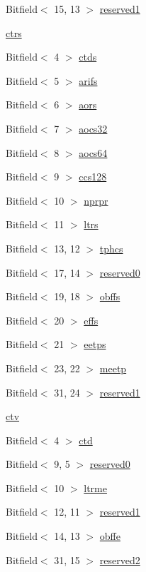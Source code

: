 \begin{DoxyCompactItemize}
Bitfield$<$ 15, 13 $>$ \hyperlink{structPXCAP_a94824b72d359a5c88960a7f3d41aae2f}{reserved1}
\item 
\hyperlink{structPXCAP_a646bd67675016bd2e5348dc4737f403c}{ctrs}
\item 
Bitfield$<$ 4 $>$ \hyperlink{structPXCAP_afbcc12ce276af1d2d296fb390021f960}{ctds}
\item 
Bitfield$<$ 5 $>$ \hyperlink{structPXCAP_a39a121912175377c1eac9c432103e14f}{arifs}
\item 
Bitfield$<$ 6 $>$ \hyperlink{structPXCAP_a98115afc2014b88488a076c132269457}{aors}
\item 
Bitfield$<$ 7 $>$ \hyperlink{structPXCAP_aaf5eba11f85bdbb91991eabb578184ae}{aocs32}
\item 
Bitfield$<$ 8 $>$ \hyperlink{structPXCAP_a25e7f60f617419ee6fcdd90a4add3434}{aocs64}
\item 
Bitfield$<$ 9 $>$ \hyperlink{structPXCAP_a01ccf729e002cfd7bc0432830de084e2}{ccs128}
\item 
Bitfield$<$ 10 $>$ \hyperlink{structPXCAP_a0d42f7e5a1b9fb808f7e43465ddc10bf}{nprpr}
\item 
Bitfield$<$ 11 $>$ \hyperlink{structPXCAP_a73de8e8bfbee5b4f7727f4ff28fef100}{ltrs}
\item 
Bitfield$<$ 13, 12 $>$ \hyperlink{structPXCAP_a60eb67968c94996ae21364300df1b236}{tphcs}
\item 
Bitfield$<$ 17, 14 $>$ \hyperlink{structPXCAP_aaf0d2cf8841d071aecd765d4e3aac530}{reserved0}
\item 
Bitfield$<$ 19, 18 $>$ \hyperlink{structPXCAP_a9a1b2491a798b85aefa18f9ef8954142}{obffs}
\item 
Bitfield$<$ 20 $>$ \hyperlink{structPXCAP_a151f8062949cfe3fc86300a0fb1f3423}{effs}
\item 
Bitfield$<$ 21 $>$ \hyperlink{structPXCAP_ae181c34c7cc6481d98e6e99f98bb7408}{eetps}
\item 
Bitfield$<$ 23, 22 $>$ \hyperlink{structPXCAP_a4dc86d53081f7d7a93eb1d3d30a16241}{meetp}
\item 
Bitfield$<$ 31, 24 $>$ \hyperlink{structPXCAP_af1c9ecd1d8305d1b6e06ac12a13575b4}{reserved1}
\item 
\hyperlink{structPXCAP_a1980add6a9c3d780071a3f245d7996ed}{ctv}
\item 
Bitfield$<$ 4 $>$ \hyperlink{structPXCAP_ac23178334a6137202aa9c7c1642c6813}{ctd}
\item 
Bitfield$<$ 9, 5 $>$ \hyperlink{structPXCAP_af3233047d63f048360301cd82170b09c}{reserved0}
\item 
Bitfield$<$ 10 $>$ \hyperlink{structPXCAP_af399d0a5a6f2794eae85273068798511}{ltrme}
\item 
Bitfield$<$ 12, 11 $>$ \hyperlink{structPXCAP_a5c74ab42f547915cf2f1a633125bfb11}{reserved1}
\item 
Bitfield$<$ 14, 13 $>$ \hyperlink{structPXCAP_a0e38762b1fb64736a78620afe749ac9f}{obffe}
\item 
Bitfield$<$ 31, 15 $>$ \hyperlink{structPXCAP_a10f49b1c91b22b18b93ba669ca1c6191}{reserved2}
\end{DoxyCompactItemize}


